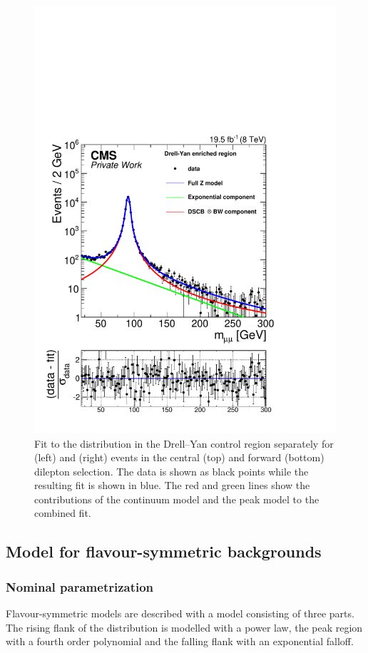 \begin{figure}[htbp]
\begin{minipage}[t]{0.49\textwidth}
\includegraphics[width=\textwidth]{plots/results/fit/expoFitMM_Log_Forward.pdf}
\end{minipage}
\caption{Fit to the \mll distribution in the Drell--Yan control region separately for \EE (left) and \MM (right) events in the central (top) and forward (bottom) dilepton selection. The data is shown as black points while the resulting fit is shown in blue. The red and green lines show the contributions of the continuum model and the peak model to the combined fit.}
\label{fig:dyFits}
\end{figure}


\subsection{Model for flavour-symmetric backgrounds}

\subsubsection{Nominal parametrization}
Flavour-symmetric models are described with a model consisting of three parts. The rising flank of the distribution is modelled with a power law, the peak region with a fourth order polynomial and the falling flank with an exponential falloff. 

